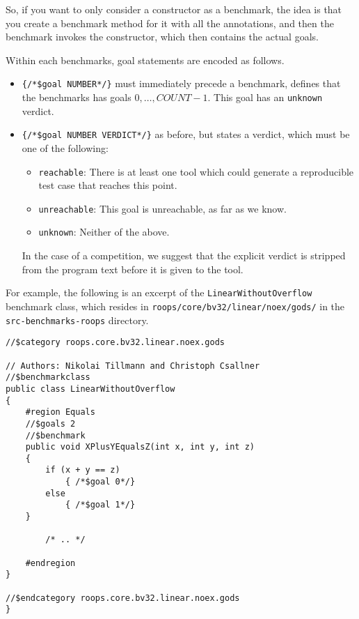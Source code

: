 So, if you want to only consider a constructor as a benchmark, the idea is that you create a benchmark method for it with all the annotations, and then the benchmark invokes the constructor, which then contains the actual goals.

Within each benchmarks, goal statements are encoded as follows.
\begin{itemize}
\item {\tt \{/*\$goal NUMBER*/\}} must immediately precede a benchmark, defines that the benchmarks has goals $0, \ldots, COUNT-1$. 
This goal has an {\tt unknown} verdict.
\item {\tt \{/*\$goal NUMBER VERDICT*/\}} as before, but states a verdict, which must be one of the following:
\begin{itemize}
\item {\tt reachable}: There is at least one tool which could generate a reproducible test case that reaches this point.
\item {\tt unreachable}: This goal is unreachable, as far as we know.
\item {\tt unknown}: Neither of the above.
\end{itemize}
In the case of a competition, we suggest that the explicit verdict is stripped
from the program text before it is given to the tool.
\end{itemize}

For example, the following is an excerpt of the 
\verb|LinearWithoutOverflow| benchmark class,
which resides in \verb|roops/core/bv32/linear/noex/gods/|
in the \verb|src-benchmarks-roops| directory.

\begin{verbatim}
//$category roops.core.bv32.linear.noex.gods

// Authors: Nikolai Tillmann and Christoph Csallner
//$benchmarkclass
public class LinearWithoutOverflow
{
    #region Equals
    //$goals 2
    //$benchmark
    public void XPlusYEqualsZ(int x, int y, int z)
    {
        if (x + y == z)
            { /*$goal 0*/}
        else
            { /*$goal 1*/}
    }
		
		/* .. */
		
    #endregion
}
    
//$endcategory roops.core.bv32.linear.noex.gods		
}
\end{verbatim}

